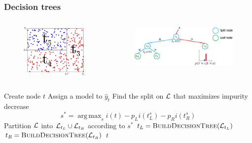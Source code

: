 \documentclass{beamer}
\DeclareMathOperator*{\argmax}{arg\,max}
\begin{document}
\begin{frame}[fragile]
    \frametitle{Decision trees \citep{breiman:1984}}
    \begin{columns}
        \begin{column}{0.3\textwidth}
            \begin{figure}
            \includegraphics[width=\textwidth]{./figures/tree-partition-d.pdf}
            \end{figure}
        \end{column}
        \begin{column}{0.7\textwidth}
            \begin{figure}
            \includegraphics[width=\textwidth]{./figures/tree-simple.pdf}
            \end{figure}
        \end{column}
    \end{columns}

{\scriptsize
\begin{algorithmic}
    \State Create node $t$
        \State Assign a model to $\widehat{y}_t$
    \Else
        \State Find the split on ${\cal L}$ that maximizes impurity decrease $$s^* = \argmax_{s} i(t) - p_L i(t^s_L) - p_R i(t^s_R)$$
        \State Partition ${\cal L}$ into ${\cal L}_{t_L} \cup {\cal L}_{t_R}$ according to $s^*$
        \State $t_L = \Call{BuildDecisionTree}{{\cal L}_{t_L}}$
        \State $t_R = \Call{BuildDecisionTree}{{\cal L}_{t_R}}$
    \EndIf
    \State \Return $t$
\EndFunction
\end{algorithmic}
}

\end{frame}
\end{document}
